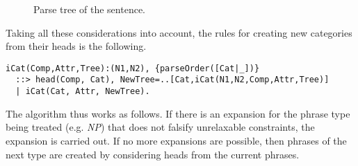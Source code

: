 \documentclass{llncs}
\newcommand{\PN}{\textit{PN}\xspace}
\newcommand{\NP}{\textit{NP}\xspace}
\newcommand{\VP}{\textit{VP}\xspace}
\newcommand{\Se}{\textit{S}\xspace}
\newcommand{\N}{\textit{N}\xspace}
\newcommand{\V}{\textit{V}\xspace}
\newcommand{\D}{\textit{D}\xspace}
\begin{document}
\begin{itemize}
\begin{figure}[H]
\begin{center}
  \caption{Parse tree of the sentence.}
  \label{fig:tree}
  \end{center}
\end{figure}
\end{itemize}

Taking all these considerations into account, the rules for creating new categories from their heads is the following.
\begin{verbatim}
iCat(Comp,Attr,Tree):(N1,N2), {parseOrder([Cat|_])}
  ::> head(Comp, Cat), NewTree=..[Cat,iCat(N1,N2,Comp,Attr,Tree)]
  | iCat(Cat, Attr, NewTree).
\end{verbatim}





The algorithm thus works as follows. If there is an expansion for the phrase type being treated (e.g. \NP) that does not falsify unrelaxable constraints, the expansion is carried out. If no more expansions are possible, then phrases of the next type are created by considering heads from the current phrases.
\end{document}
